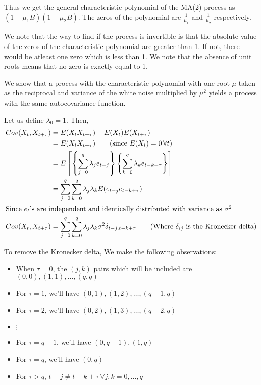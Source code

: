 \documentclass[12pt, oneside]{article}
\begin{document}
\begin{enumerate}
{    Thus we get the general characteristic polynomial of the MA(2) process as
    \((1 - \mu_1 B)(1 - \mu_2 B)\). The zeros of the polynomial are \(\frac{1}{\mu_1}\)
    and \(\frac{1}{\mu_2}\) respectively.

    We note that the way to find if the process is invertible is that the absolute
    value of the zeros of the characteristic polynomial are greater than 1. If not, there would be atleast one zero which is less than 1. We note that the
    absence of unit roots means that no zero is exactly equal to 1.

    We show that a process with the characteristic polynomial with one root \(\mu\) taken
    as the reciprocal and variance of the white noise multiplied by \(\mu^2\) yields
    a process with the same autocovariance function.

    Let us define \(\lambda_0 = 1\). Then,
    \begin{align*}
        Cov(X_t, X_{t+\tau}) &= E(X_t X_{t+\tau}) - E(X_t)E(X_{t+\tau}) \\
            &= E(X_t X_{t+\tau}) \tag*{(since \(E(X_t) = 0 \,\forall t\))} \\
            &= E\left[\left\{\sum_{j=0}^{q}\lambda_j e_{t-j}\right\}\left\{\sum_{k=0}^{q}\lambda_k e_{t-k+\tau}\right\}\right] \\
            &= \sum_{j=0}^{q} \sum_{k=0}^{q} \lambda_j \lambda_k E(e_{t-j} e_{t-k+\tau}) \\
        \intertext{Since \(e_t\)'s are independent and identically distributed with variance as
        \(\sigma^2\)}
        Cov(X_t, X_{t+\tau}) &= \sum_{j=0}^{q} \sum_{k=0}^{q} \lambda_j \lambda_k \sigma^2 \delta_{t-j,t-k+\tau}
            \tag*{(Where \(\delta_{ij}\) is the Kronecker delta)}
    \end{align*}

    To remove the Kronecker delta, We make the following observations:
    \begin{itemize}
        \item When \(\tau = 0\), the \((j, k)\) pairs which will be included are \((0, 0), (1, 1), \ldots, (q, q)\)
        \item For \(\tau = 1\), we'll have \((0, 1), (1, 2), \ldots, (q-1, q)\)
        \item For \(\tau = 2\), we'll have \((0, 2), (1, 3), \ldots, (q-2, q)\)
        \item \(\vdots\)
        \item For \(\tau = q-1\), we'll have \((0, q-1), (1, q)\)
        \item For \(\tau = q\), we'll have \((0, q)\)
        \item For \(\tau > q\), \(t - j \neq t - k + \tau \,\forall j, k = 0, \ldots, q\)
    \end{itemize}

}
\end{enumerate}
\end{document}
